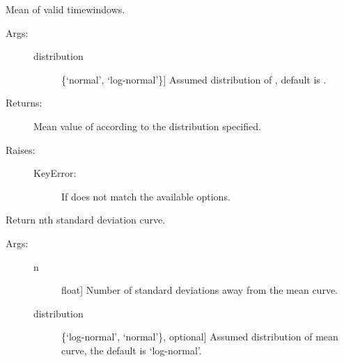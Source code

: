 \documentclass[letterpaper,10pt,english,openany,oneside]{sphinxmanual}
\begin{document}
\begin{fulllineitems}
\begin{fulllineitems}
\label{\detokenize{index:hvsrpy.Hvsr.mean_f0_frq}}
Mean  of valid timewindows.
\begin{description}
\item[{Args:}] \leavevmode\begin{description}
\item[{distribution}] \leavevmode{[}\{‘normal’, ‘log-normal’\}{]}
Assumed distribution of , default is .

\end{description}

\item[{Returns:}] \leavevmode
Mean value of  according to the distribution specified.

\item[{Raises:}] \leavevmode\begin{description}
\item[{KeyError:}] \leavevmode
If  does not match the available options.

\end{description}

\end{description}

\end{fulllineitems}


\begin{fulllineitems}
\label{\detokenize{index:hvsrpy.Hvsr.nstd_curve}}
Return nth standard deviation curve.
\begin{description}
\item[{Args:}] \leavevmode\begin{description}
\item[{n}] \leavevmode{[}float{]}
Number of standard deviations away from the mean curve.

\item[{distribution}] \leavevmode{[}\{‘log-normal’, ‘normal’\}, optional{]}
Assumed distribution of mean curve, the default is
‘log-normal’.

\end{description}


\end{description}
\end{fulllineitems}
\end{fulllineitems}
\end{document}
